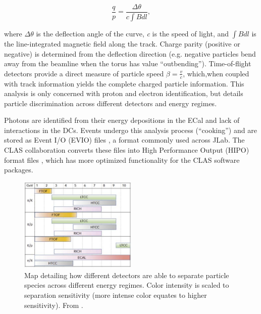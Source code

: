     \begin{equation}\label{eq:particle_track}
        \frac{q}{p} = \frac{\Delta \theta}{c \int B dl},
    \end{equation}

    \noindent where $\Delta \theta$ is the deflection angle of the curve, \textit{c} is the speed of light, and $\int B dl$ is the line-integrated magnetic field along the track. Charge parity (positive or negative) is determined from the deflection direction (e.g. negative particles bend away from the beamline when the torus has value ``outbending''). Time-of-flight detectors provide a direct measure of particle speed $\beta = \frac{v}{c}$, which,when coupled with track information yields the complete charged particle information. This analysis is only concerned with proton and electron identification, but  details particle discrimination across different detectors and energy regimes.
    
    Photons are identified from their energy depositions in the ECal and lack of interactions in the DCs. Events undergo this analysis process (``cooking'') and are stored as Event I/O (EVIO) files \parencite{Wolin2007EVIOPackage}, a format commonly used across JLab. The CLAS collaboration converts these files into High Performance Output (HIPO) format files \parencite{Ziegler2020TheReconstruction}, which has more optimized functionality for the CLAS software packages. 

    \begin{figure}[H]
        \centering
         \includegraphics[width=0.5\textwidth]{Chapters/Ch2-Experiment/recon_pid/pid_figs/pid-clas12-new.png}
        \caption[Particle Separation by Detector]{Map detailing how different detectors are able to separate particle species across different energy regimes. Color intensity is scaled to separation sensitivity (more intense color equates to higher sensitivity). From \parencite{Burkert2020TheLaboratory}.}
        \label{fig:clas12-pid-overview}
    \end{figure}


